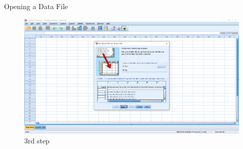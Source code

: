 \begin{frame}[t]{Opening a Data File}
		\begin{figure}
			\centering
			\includegraphics[width=12cm]{img/o_data_4}
			\caption{3rd step}
		\end{figure}
\end{frame}





